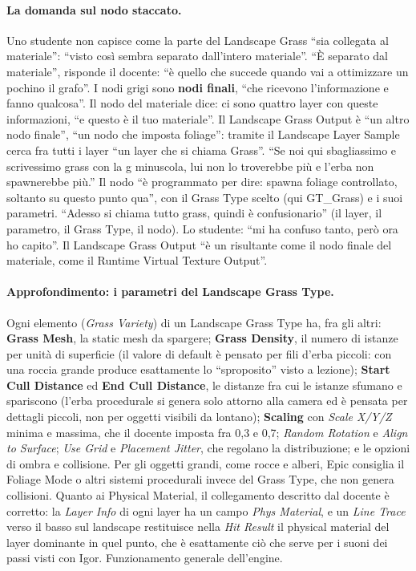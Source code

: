 \paragraph{La domanda sul nodo staccato.} Uno studente non capisce come la parte del
Landscape Grass ``sia collegata al materiale'': ``visto così sembra separato dall'intero
materiale''. ``È separato dal materiale'', risponde il docente: ``è quello che succede quando
vai a ottimizzare un pochino il grafo''. I nodi grigi sono \textbf{nodi finali}, ``che
ricevono l'informazione e fanno qualcosa''. Il nodo del materiale dice: ci sono quattro
layer con queste informazioni, ``e questo è il tuo materiale''. Il Landscape Grass Output è
``un altro nodo finale'', ``un nodo che imposta foliage'': tramite il Landscape Layer Sample
cerca fra tutti i layer ``un layer che si chiama Grass''. ``Se noi qui sbagliassimo e
scrivessimo grass con la g minuscola, lui non lo troverebbe più e l'erba non spawnerebbe
più.'' Il nodo ``è programmato per dire: spawna foliage controllato, soltanto su questo
punto qua'', con il Grass Type scelto (qui GT\_Grass) e i suoi parametri. ``Adesso si chiama
tutto grass, quindi è confusionario'' (il layer, il parametro, il Grass Type, il nodo).
Lo studente: ``mi ha confuso tanto, però ora ho capito''. Il Landscape Grass Output ``è un
risultante come il nodo finale del materiale, come il Runtime Virtual Texture Output''.

\paragraph{Approfondimento: i parametri del Landscape Grass Type.} Ogni elemento (\emph{Grass
Variety}) di un Landscape Grass Type ha, fra gli altri: \textbf{Grass Mesh}, la static mesh da
spargere; \textbf{Grass Density}, il numero di istanze per unità di superficie (il valore di
default è pensato per fili d'erba piccoli: con una roccia grande produce esattamente lo
``sproposito'' visto a lezione); \textbf{Start Cull Distance} ed \textbf{End Cull Distance},
le distanze fra cui le istanze sfumano e spariscono (l'erba procedurale si genera solo
attorno alla camera ed è pensata per dettagli piccoli, non per oggetti visibili da
lontano); \textbf{Scaling} con \emph{Scale X/Y/Z} minima e massima, che il docente imposta
fra 0,3 e 0,7; \emph{Random Rotation} e \emph{Align to Surface}; \emph{Use Grid} e
\emph{Placement Jitter}, che regolano la distribuzione; e le opzioni di ombra e collisione.
Per gli oggetti grandi, come rocce e alberi, Epic consiglia il Foliage Mode o altri sistemi
procedurali invece del Grass Type, che non genera collisioni. Quanto ai Physical Material,
il collegamento descritto dal docente è corretto: la \emph{Layer Info} di ogni layer ha un
campo \emph{Phys Material}, e un \emph{Line Trace} verso il basso sul landscape restituisce
nella \emph{Hit Result} il physical material del layer dominante in quel punto, che è
esattamente ciò che serve per i suoni dei passi visti con Igor. Funzionamento generale
dell'engine.

